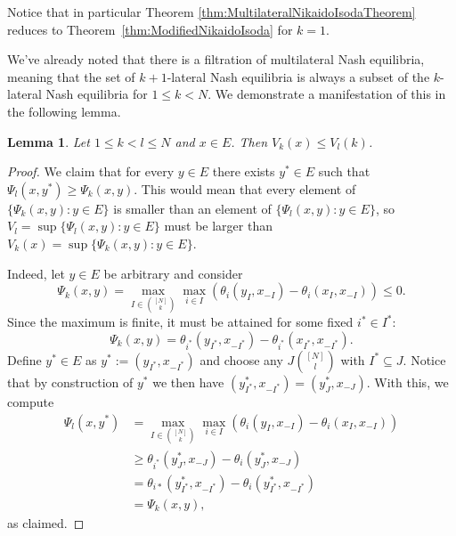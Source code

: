 \documentclass[a4paper,11pt,reqno,english]{amsart}
\theoremstyle{plain}
\newtheorem{lemma}[theorem]{Lemma}
\theoremstyle{definition}
\begin{document}
\medskip
Notice that in particular Theorem \ref{thm:MultilateralNikaidoIsodaTheorem} reduces to Theorem~\ref{thm:ModifiedNikaidoIsoda} for $k=1$.

We've already noted that there is a filtration of multilateral Nash equilibria, meaning that the set of $k+1$-lateral Nash equilibria is always a subset of the $k$-lateral Nash equilibria for $1\leq k < N$. We demonstrate a manifestation of this in the following lemma.

\begin{lemma}\label{lem:NikaidoIsodaIncreasing}
	Let $1 \leq k < l \leq N$ and $x\in E$. Then $V_k(x) \leq V_l(k)$.
\end{lemma}
\begin{proof}
	We claim that for every $y\in E$ there exists $y^*\in E$ such that $\Psi_l(x,y^*) \geq \Psi_k(x,y)$. This would mean that every element of $\{\Psi_k(x,y)\colon y\in E\}$ is smaller than an element of $\{\Psi_l(x,y)\colon y\in E\}$, so $V_l = \sup\{\Psi_l(x,y)\colon y\in E\}$ must be larger than $V_k(x) = \sup \{\Psi_k(x,y)\colon y\in E\}$.

	Indeed, let $y\in E$ be arbitrary and consider
	\begin{displaymath}
		\Psi_k(x,y) =\max_{I\in\binom{[N]}{k}}\max_{i\in I}\left(\theta_i(y_I, x_{-I}) - \theta_i(x_I, x_{-I})\right) \leq 0.
	\end{displaymath}
	Since the maximum is finite, it must be attained for some fixed $i^* \in I^*$:
	\begin{displaymath}
		\Psi_k(x,y) = \theta_{i^*}(y_{I^*},x_{-I^*}) - \theta_{i^*}(x_{I^*},x_{-I^*}).
	\end{displaymath}
	Define $y^* \in E$ as $ y^* := (y_{I^*}, x_{-I^*})$ and choose any $J\binom{[N]}{l}$ with $I^*\subseteq J$. Notice that by construction of $y^{*}$ we then have $(y^{*}_{I^*}, x_{-I^*}) = (y^{*}_{J}, x_{-J})$. With this, we compute
	\begin{align*}
		\Psi_l(x,y^*) & = \max_{I\in\binom{[N]}{k}}\max_{i\in I}\left(\theta_i(y_I, x_{-I}) - \theta_i(x_I, x_{-I})\right) \\
		              & \geq \theta_{i^*}(y^{*}_J, x_{-J}) - \theta_i(y^*_J, x_{-J})                                       \\
		              & =  \theta_{i*}(y^{*}_{I^*}, x_{-I^*}) - \theta_i(y^*_{I^*}, x_{-I^*})                              \\
		              & = \Psi_k(x,y),
	\end{align*}
	as claimed.
\end{proof}
\end{document}
